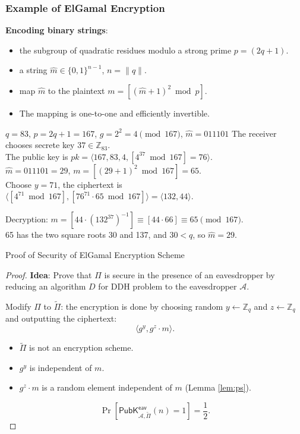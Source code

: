 \begin{frame}\frametitle{Example of ElGamal Encryption}
\textbf{Encoding binary strings}:
\begin{itemize}
\item the subgroup of quadratic residues modulo a strong prime $p = (2q+1)$.
\item a string $\hat{m} \in \{0,1\}^{n-1}$, $n = \|q\|$.
\item map $\hat{m}$ to the plaintext $m = [(\hat{m}+1)^2 \bmod p]$.
\item The mapping is one-to-one and efficiently invertible.
\end{itemize}
\begin{exampleblock}{$q=83$, $p=2q+1=167$, $g=2^2=4 \pmod{167}$, $\hat{m}=011101$}
The receiver chooses secrete key $37 \in \mathbb{Z}_{83}$.\\
The public key is $pk=\langle 167,83,4,[4^{37} \bmod 167]=76\rangle$.\\
$\hat{m}=011101=29$, $m = [(29+1)^2 \bmod 167] = 65$.\\
Choose $y=71$, the ciphertext is $\langle [4^{71} \bmod 167], [76^{71}\cdot 65 \bmod 167]\rangle = \langle 132,44\rangle$.
\newline

Decryption: $m= [44\cdot (132^{37})^{-1}] \equiv [44\cdot 66] \equiv 65 \pmod{167}$.\\
65 has the two square roots 30 and 137, and $30 < q$, so $\hat{m}=29$.
\end{exampleblock}
\end{frame}
\begin{frame}{Proof of Security of ElGamal Encryption Scheme}
\begin{proof}
\textbf{Idea}: Prove that $\Pi$ is secure in the presence of an eavesdropper by reducing an algorithm $D$ for DDH problem to the eavesdropper $\mathcal{A}$.
\newline

Modify $\Pi$ to $\tilde{\Pi}$: the encryption is done by choosing random $y \gets \mathbb{Z}_q$ and $z \gets \mathbb{Z}_q$ and outputting the ciphertext:
\[ \langle g^y, g^z\cdot m\rangle.\]
\begin{itemize}
\item $\tilde{\Pi}$ is not an encryption scheme.
\item $g^y$ is independent of $m$.
\item $g^z\cdot m$ is a random element independent of $m$ (Lemma \ref{lem:ps}).
\end{itemize}
\[ \Pr\left[\mathsf{PubK}^{\mathsf{eav}}_{\mathcal{A},\tilde{\Pi}}(n)=1\right] = \frac{1}{2}.\]
\end{proof}
\end{frame}
